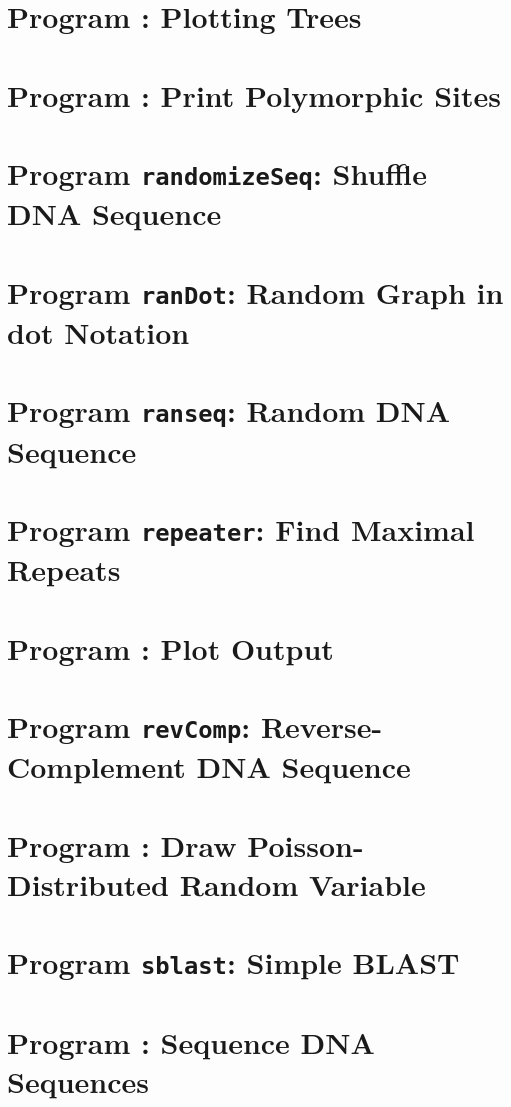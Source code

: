 \documentclass[a4paper]{report}
\begin{document}
\chapter{Program : Plotting Trees}\label{ch:pt}

\chapter{Program : Print Polymorphic Sites}\label{ch:pp}

\chapter{Program \texttt{randomizeSeq}: Shuffle DNA
  Sequence}\label{ch:rs}

\chapter{Program \texttt{ranDot}: Random Graph in dot Notation}\label{ch:rd}

\chapter{Program \texttt{ranseq}: Random DNA Sequence}\label{ch:ran}

\chapter{Program \texttt{repeater}: Find Maximal
  Repeats}\label{ch:rep}

\chapter{Program : Plot 
  Output}\label{ch:r2p}

\chapter{Program \texttt{revComp}: Reverse-Complement DNA
  Sequence}\label{ch:rev}

\chapter{Program : Draw Poisson-Distributed Random
  Variable}\label{ch:rpo}

\chapter{Program \texttt{sblast}: Simple BLAST}\label{ch:sb}

\chapter{Program : Sequence DNA Sequences}\label{ch:seq}

\end{document}
